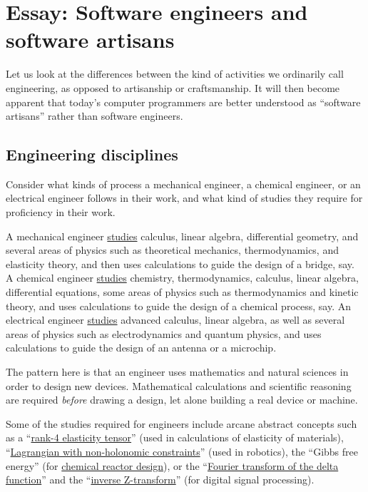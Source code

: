 
\chapter{Essay: Software engineers and software artisans}

Let us look at the differences between the kind of activities we ordinarily
call engineering, as opposed to artisanship or craftsmanship. It will
then become apparent that today's computer programmers are better
understood as ``software artisans'' rather than software engineers.

\section{Engineering disciplines }

Consider what kinds of process a mechanical engineer, a chemical engineer,
or an electrical engineer follows in their work, and what kind of
studies they require for proficiency in their work.

A mechanical engineer \href{https://www.colorado.edu/mechanical/undergraduate-students/curriculum}{studies}
calculus, linear algebra, differential geometry, and several areas
of physics such as theoretical mechanics, thermodynamics, and elasticity
theory, and then uses calculations to guide the design of a bridge,
say. A chemical engineer \href{https://www.colorado.edu/engineering/sample-undergraduate-curriculum-chemical}{studies}
chemistry, thermodynamics, calculus, linear algebra, differential
equations, some areas of physics such as thermodynamics and kinetic
theory, and uses calculations to guide the design of a chemical process,
say. An electrical engineer \href{https://seas.yale.edu/departments/electrical-engineering/undergraduate-study/undergraduate-curriculum-information}{studies}
advanced calculus, linear algebra, as well as several areas of physics
such as electrodynamics and quantum physics, and uses calculations
to guide the design of an antenna or a microchip.

The pattern here is that an engineer uses mathematics and natural
sciences in order to design new devices. Mathematical calculations
and scientific reasoning are required \emph{before} drawing a design,
let alone building a real device or machine.

Some of the studies required for engineers include arcane abstract
concepts such as a ``\href{https://serc.carleton.edu/NAGTWorkshops/mineralogy/mineral_physics/tensors.html}{rank-4 elasticity tensor}''
(used in calculations of elasticity of materials), ``\href{https://arxiv.org/abs/math/0008147}{Lagrangian with non-holonomic constraints}''
(used in robotics), the ``Gibbs free energy'' (for \href{https://www.amazon.com/Introduction-Chemical-Engineering-Kinetics-Reactor/dp/1118368258}{chemical reactor design}),
or the ``\href{https://www.youtube.com/watch?v=KAbqISZ6SHQ}{Fourier transform of the delta function}''
and the ``\href{https://ocw.mit.edu/resources/res-6-008-digital-signal-processing-spring-2011/video-lectures/lecture-6-the-inverse-z-transform/}{inverse Z-transform}''
(for digital signal processing).


